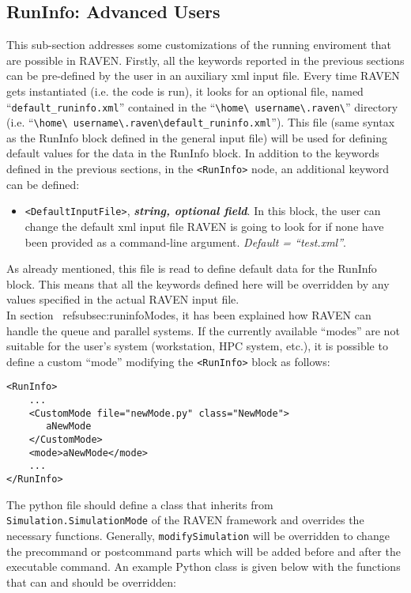 \subsection{RunInfo: Advanced Users}
\label{subsec:runinfoadvanced}
This sub-section addresses some customizations of the running enviroment that
are possible in RAVEN.
%
Firstly, all the keywords reported in the previous sections can be pre-defined
by the user in an auxiliary xml input file.
%
Every time RAVEN gets instantiated (i.e. the code is run), it looks for an
optional file, named ``\texttt{default\_runinfo.xml}'' contained in the
``\texttt{\textbackslash home\textbackslash
username\textbackslash.raven\textbackslash}'' directory (i.e.
``\texttt{\textbackslash home\textbackslash
username\textbackslash.raven\textbackslash default\_runinfo.xml}'').
%
This file (same syntax as the RunInfo block defined in the general input file)
will be used for defining default values for the data in the RunInfo block. In
addition to the keywords defined in the previous sections, in the
\texttt{<RunInfo>} node, an additional keyword can be defined:
\begin{itemize}
\item \texttt{<DefaultInputFile>}, \textbf{\textit{string, optional field}}. In
this block, the user can change the default xml input file RAVEN is going to
look for if none have been provided as a command-line argument.
%
\textit{Default = ``test.xml''}.
\end{itemize}
As already mentioned, this file is read to define default data for the RunInfo
block.
%
This means that all the keywords defined here will be overridden by any values
specified in the actual RAVEN input file.
%
\\ In section ~ref{subsec:runinfoModes}, it has been explained how RAVEN can
handle the queue and parallel systems.
%
If the currently available ``modes'' are not suitable for the user's system
(workstation, HPC system, etc.), it is possible to define a custom ``mode''
modifying the \texttt{<RunInfo>} block as follows:
\begin{lstlisting}[style=XML]
<RunInfo>
    ...
    <CustomMode file="newMode.py" class="NewMode">
       aNewMode
    </CustomMode>
    <mode>aNewMode</mode>
    ...
</RunInfo>
\end{lstlisting}

The python file should define a class that inherits from
\texttt{Simulation.SimulationMode} of the RAVEN framework and overrides the
necessary functions. Generally, \texttt{modifySimulation} will be overridden to
change the precommand or postcommand parts which will be added before and after
the executable command.
%
An example Python class is given below with the functions that can and should be
overridden:

